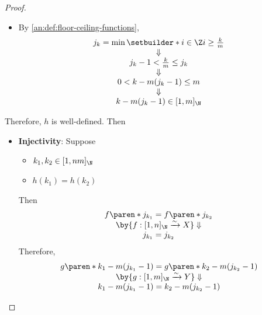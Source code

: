 \begin{proof}
\begin{itemize}
\begin{itemize}
            \item By \cref{an:def:floor-ceiling-functions},
                  \[
                    \begin{array}{c}
                      j_{k} = \min\setbuilder*{i \in \Z}{i \geq \frac{k}{m}} \\
                      \Downarrow                                             \\
                      j_{k} - 1 < \frac{k}{m} \leq j_{k}                     \\
                      \Downarrow                                             \\
                      0 < k - m(j_{k} - 1) \leq m                            \\
                      \Downarrow                                             \\
                      k - m(j_{k} - 1) \in [1, m]_{\N}
                    \end{array}
                  \]
          \end{itemize}
          Therefore, $h$ is well-defined. Then
          \begin{itemize}
            \item \textbf{Injectivity}: Suppose
                  \begin{itemize}
                    \item $k_{1}, k_{2} \in [1, nm]_{\N}$
                    \item $h(k_{1}) = h(k_{2})$
                  \end{itemize}
                  Then
                  \[
                    \begin{array}{c}
                      f\paren*{j_{k_{1}}} = f\paren*{j_{k_{2}}}                        \\
                      \by{\ensuremath{f: [1, n]_{\N} \xrightarrow{\sim} X}} \Downarrow \\
                      j_{k_{1}} = j_{k_{2}}
                    \end{array}
                  \]
                  Therefore,
                  \[
                    \begin{array}{c}
                      g\paren*{k_{1} - m(j_{k_{1}} - 1)} = g\paren*{k_{2} - m(j_{k_{2}} - 1)} \\
                      \by{\ensuremath{g: [1, m]_{\N} \xrightarrow{\sim} Y}} \Downarrow        \\
                      k_{1} - m(j_{k_{1}} - 1) = k_{2} - m(j_{k_{2}} - 1)                     \\

\end{array}\]
\end{itemize}
\end{itemize}
\end{proof}
